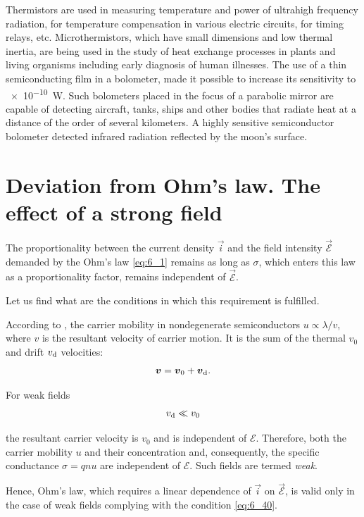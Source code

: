 Thermistors are used in measuring temperature and power of ultrahigh frequency radiation, for temperature compensation in various electric circuits, for timing relays, etc. Microthermistors, which have small dimensions and low thermal inertia, are being used in the study of heat exchange processes in plants and living organisms including early diagnosis of human illnesses. The use of a thin semiconducting film in a bolometer, made it possible to increase its sensitivity to \SI{e-10}{\watt}. Such bolometers placed in the focus of a parabolic mirror are capable of detecting aircraft, tanks, ships and other bodies that radiate heat at a distance of the order of several kilometers. A highly sensitive semiconductor bolometer detected infrared radiation reflected by the moon's surface.

\section{Deviation from Ohm's law. The effect of a strong field}\label{sec:58}

The proportionality between the current density $\vec{i}$ and the field intensity $\vec{\mathcal{E}}$ demanded by the Ohm's law \eqref{eq:6_1} remains as long as $\sigma$, which enters this law as a proportionality factor, remains independent of $\vec{\mathcal{E}}$.

Let us find what are the conditions in which this requirement is fulfilled.

According to , the carrier mobility in nondegenerate semiconductors $u\propto\lambda/v$, where $v$ is the resultant velocity of carrier motion. It is the sum of the thermal $v_0$ and drift $v_{\text{d}}$ velocities:
\begin{equation*}
	\boldsymbol{v} = \boldsymbol{v}_0 + \boldsymbol{v}_{\text{d}}.
\end{equation*}

\noindent
For weak fields
\begin{equation}\label{eq:6_40}
	v_{\text{d}} \ll v_0
\end{equation}

\noindent
the resultant carrier velocity is $v_0$ and is independent of $\mathcal{E}$. Therefore, both the carrier mobility $u$ and their concentration and,
consequently, the specific conductance $\sigma=qnu$ are independent of $\mathcal{E}$. Such fields are termed \textit{weak}.

Hence, Ohm's law, which requires a linear dependence of $\vec{i}$ on $\vec{\mathcal{E}}$, is valid only in the case of weak fields complying with the condition \eqref{eq:6_40}.

